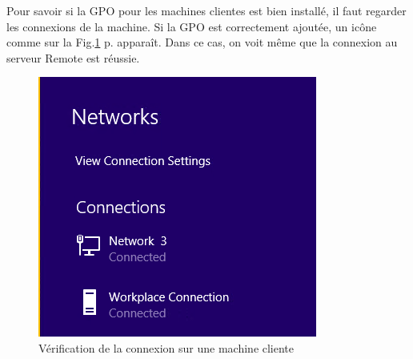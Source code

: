 Pour savoir si la GPO pour les machines clientes est bien installé, il faut regarder les connexions de la machine.
Si la GPO est correctement ajoutée, un icône comme sur la Fig.\ref{fig:clientDA} p.\pageref{fig:clientDA} apparaît.
Dans ce cas, on voit même que la connexion au serveur Remote est réussie.
\begin{figure}[ht]
	\centering
	\includegraphics{DA/ClientConnexion.png}
	\caption{Vérification de la connexion sur une machine cliente}
	\label{fig:clientDA}
\end{figure} 